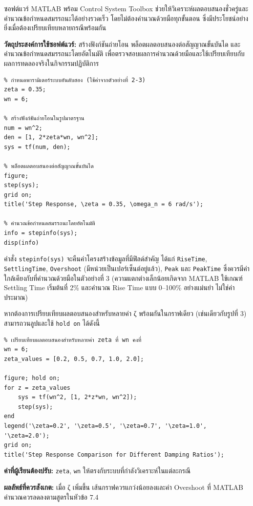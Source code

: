 ซอฟต์แวร์ MATLAB พร้อม Control System Toolbox ช่วยให้วิเคราะห์ผลตอบสนองชั่วครู่และคำนวณข้อกำหนดสมรรถนะได้อย่างรวดเร็ว โดยไม่ต้องคำนวณด้วยมือทุกขั้นตอน ซึ่งมีประโยชน์อย่างยิ่งเมื่อต้องเปรียบเทียบหลายกรณีพร้อมกัน

\textbf{วัตถุประสงค์การใช้ซอฟต์แวร์:} สร้างฟังก์ชันถ่ายโอน พล็อตผลตอบสนองต่อสัญญาณขั้นบันได และคำนวณข้อกำหนดสมรรถนะโดยอัตโนมัติ เพื่อตรวจสอบผลการคำนวณด้วยมือและใช้เปรียบเทียบกับผลการทดลองจริงในกิจกรรมปฏิบัติการ

\begin{verbatim}
% กำหนดพารามิเตอร์ระบบอันดับสอง (ใช้ค่าจากตัวอย่างที่ 2-3)
zeta = 0.35;
wn = 6;

% สร้างฟังก์ชันถ่ายโอนในรูปมาตรฐาน
num = wn^2;
den = [1, 2*zeta*wn, wn^2];
sys = tf(num, den);

% พล็อตผลตอบสนองต่อสัญญาณขั้นบันได
figure;
step(sys);
grid on;
title('Step Response, \zeta = 0.35, \omega_n = 6 rad/s');

% คำนวณข้อกำหนดสมรรถนะโดยอัตโนมัติ
info = stepinfo(sys);
disp(info)
\end{verbatim}

คำสั่ง \texttt{stepinfo(sys)} จะคืนค่าโครงสร้างข้อมูลที่มีฟิลด์สำคัญ ได้แก่ \texttt{RiseTime}, \texttt{SettlingTime}, \texttt{Overshoot} (มีหน่วยเป็นเปอร์เซ็นต์อยู่แล้ว), \texttt{Peak} และ \texttt{PeakTime} ซึ่งควรมีค่าใกล้เคียงกับที่คำนวณด้วยมือในตัวอย่างที่ 3 (ความแตกต่างเล็กน้อยเกิดจาก MATLAB ใช้เกณฑ์ Settling Time เริ่มต้นที่ 2\% และคำนวณ Rise Time แบบ 0–100\% อย่างแม่นยำ ไม่ใช่ค่าประมาณ)

หากต้องการเปรียบเทียบผลตอบสนองสำหรับหลายค่า ζ พร้อมกันในกราฟเดียว (เช่นเดียวกับรูปที่ 3) สามารถวนลูปและใช้ \texttt{hold on} ได้ดังนี้

\begin{verbatim}
% เปรียบเทียบผลตอบสนองสำหรับหลายค่า zeta ที่ wn คงที่
wn = 6;
zeta_values = [0.2, 0.5, 0.7, 1.0, 2.0];

figure; hold on;
for z = zeta_values
    sys = tf(wn^2, [1, 2*z*wn, wn^2]);
    step(sys);
end
legend('\zeta=0.2', '\zeta=0.5', '\zeta=0.7', '\zeta=1.0', '\zeta=2.0');
grid on;
title('Step Response Comparison for Different Damping Ratios');
\end{verbatim}

\textbf{ค่าที่ผู้เรียนต้องปรับ:} \texttt{zeta}, \texttt{wn} ให้ตรงกับระบบที่กำลังวิเคราะห์ในแต่ละกรณี

\textbf{ผลลัพธ์ที่ควรสังเกต:} เมื่อ ζ เพิ่มขึ้น เส้นกราฟควรแกว่งน้อยลงและค่า Overshoot ที่ MATLAB คำนวณควรลดลงตามสูตรในหัวข้อ 7.4


